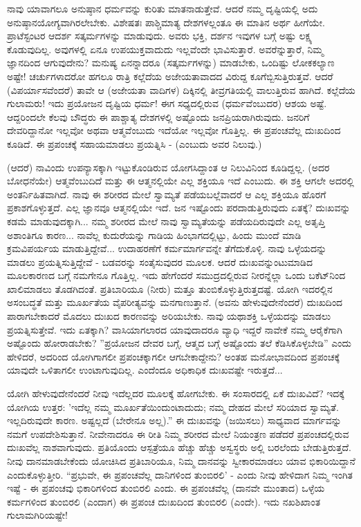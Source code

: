 ನಾವು ಯಾವಾಗಲೂ ಅನುಷ್ಠಾನ ಧರ್ಮವನ್ನು ಕುರಿತು ಮಾತನಾಡುತ್ತೇವೆ. ಆದರೆ ನಮ್ಮ ದೃಷ್ಟಿಯಲ್ಲಿ ಅದು ಅನುಷ್ಠಾನಯೋಗ್ಯವಾಗಿರಲೇಬೇಕು. ವಿಶೇಷತಃ ಪಾಶ್ಚಿಮಾತ್ಯ ದೇಶಗಳಲ್ಲಂತೂ ಈ ಮಾತಿನ ಅರ್ಥ ಹೀಗೆಯೇ. ಪ್ರಾಟೆಸ್ಟಂಟರ ಆದರ್ಶ ಸತ್ಕರ್ಮಗಳನ್ನು ಮಾಡುವುದು. ಅವರು ಭಕ್ತಿ, ದರ್ಶನ ಇವುಗಳ ಬಗ್ಗೆ ಅಷ್ಟು ಲಕ್ಷ್ಯ ಕೊಡುವುದಿಲ್ಲ. ಅವುಗಳಲ್ಲಿ ಏನೂ ಉಪಯುಕ್ತವಾದುದು ಇಲ್ಲವೆಂದೇ ಭಾವಿಸುತ್ತಾರೆ. ಅವರೆನ್ನುತ್ತಾರೆ, ನಿಮ್ಮ ಜ್ಞಾನದಿಂದ ಆಗುವುದೇನು? ಮನುಷ್ಯ ಏನನ್ನಾದರೂ (ಸತ್ಕರ್ಮಗಳನ್ನು) ಮಾಡಬೇಕು, ಒಂದಿಷ್ಟು ಲೋಕಕಲ್ಯಾಣ ಅಷ್ಟೇ! ಚರ್ಚುಗಳಾದರೋ ಹಗಲೂ ರಾತ್ರಿ ಕಲ್ಲೆದೆಯ ಅಜೇಯತಾವಾದದ ವಿರುದ್ದ ಕೂಗೆಬ್ಬಿಸುತ್ತಿರುತ್ತವೆ. ಆದರೆ (ವಿಪರ್ಯಾಸವೆಂದರೆ) ತಾವೇ ಆ (ಅಜೇಯತಾ ವಾದಿಗಳ) ದಿಕ್ಕಿನಲ್ಲಿ ತೀವ್ರಗತಿಯಲ್ಲಿ ವಾಲುತ್ತಿರುವ ಹಾಗಿದೆ. ಕಲ್ಲೆದೆಯ ಗುಲಾಮರು! ಇದು ಪ್ರಯೋಜನ ದೃಷ್ಟಿಯ ಧರ್ಮ! ಈಗ ಸಧ್ಯದಲ್ಲಿರುವ (ಧರ್ಮವೆಂಬುದರ) ಆಶಯ ಅಷ್ಟೆ. ಆದ್ದರಿಂದಲೇ ಕೆಲವು ಬೌದ್ಧರು ಈ ಪಾಶ್ಚಾತ್ಯ ದೇಶಗಳಲ್ಲಿ ಅಷ್ಟೊಂದು ಜನಪ್ರಿಯರಾಗಿರುವುದು. ಜನರಿಗೆ ದೇವರಿದ್ದಾನೋ ಇಲ್ಲವೋ ಅಥವಾ ಆತ್ಮವೆಂಬುದು ಇದೆಯೋ ಇಲ್ಲವೋ ಗೊತ್ತಿಲ್ಲ. ಈ ಪ್ರಪಂಚವೆಲ್ಲ ದುಃಖದಿಂದ ಕೂಡಿದೆ. ಈ ಪ್ರಪಂಚಕ್ಕೆ ಸಹಾಯಮಾಡಲು ಪ್ರಯತ್ನಿಸಿ - (ಎಂಬುದು ಅವರ ನಿಲುವು.)

(ಆದರೆ) ನಾವಿಂದು ಉಪನ್ಯಾಸಕ್ಕಾಗಿ ಇಟ್ಟುಕೊಂಡಿರುವ ಯೋಗಸಿದ್ದಾಂತ ಆ ನಿಲುವಿನಿಂದ ಕೂಡಿದ್ದಲ್ಲ. (ಅದರ ಬೋಧನೆಯೇ) ಆತ್ಮವೆಂಬುದಿದೆ ಮತ್ತು ಈ ಆತ್ಮನಲ್ಲಿಯೇ ಎಲ್ಲ ಶಕ್ತಿಯೂ ಇದೆ ಎಂಬುದು. ಈ ಶಕ್ತಿ ಆಗಲೇ ಅದರಲ್ಲಿ ಅಂತರ್ನಿಹಿತವಾಗಿದೆ. ನಾವು ಈ ಶರೀರದ ಮೇಲೆ ಸ್ವಾಮ್ಯತೆ ಪಡೆಯಬಲ್ಲೆವಾದರೆ ಆ ಎಲ್ಲ ಶಕ್ತಿಯೂ ಹೊರಗೆ ಪ್ರಕಾಶಗೊಳ್ಳುತ್ತದೆ. ಎಲ್ಲ ಜ್ಞಾನವೂ ಆತ್ಮನಲ್ಲಿಯೇ ಇದೆ. ಜನ ಇಷ್ಟೊಂದು ಪರದಾಡುತ್ತಿರುವುದು ಏತಕ್ಕೆ? ದುಃಖವನ್ನು ಕಡಮೆ ಮಾಡುವುದಕ್ಕಾಗಿ... ನಮ್ಮ ಶರೀರದ ಮೇಲೆ ನಾವು ಸ್ವಾಮ್ಯತೆಯನ್ನು ಪಡೆಯದಿರುವುದೇ ಎಲ್ಲ ಅತೃಪ್ತಿ ಅಶಾಂತಿಗೂ ಕಾರಣ... ನಾವೆಲ್ಲ ಕುದುರೆಯನ್ನು ಗಾಡಿಯ ಹಿಂಭಾಗದಲ್ಲಿಟ್ಟು, ಹಿಂದು ಮುಂದೆ ಮಾಡಿ ಕ್ರಮವಿಪರ್ಯಯ ಮಾಡುತ್ತಿದ್ದೇವೆ... ಉದಾಹರಣೆಗೆ ಕರ್ಮಮಾರ್ಗವನ್ನೇ ತೆಗೆದುಕೊಳ್ಳಿ. ನಾವು ಒಳ್ಳೆಯದನ್ನು ಮಾಡಲು ಪ್ರಯತ್ನಿಸುತ್ತಿದ್ದೇವೆ - ಬಡವರನ್ನು ಸಂತೈಸುವುದರ ಮೂಲಕ. ಆದರೆ ದುಃಖವನ್ನುಂಟುಮಾಡಿದ ಮೂಲಕಾರಣದ ಬಗ್ಗೆ ನಮಗೇನೂ ಗೊತ್ತಿಲ್ಲ. ಇದು ಹೇಗೆಂದರೆ ಸಮುದ್ರದಲ್ಲಿರುವ ನೀರನ್ನೆಲ್ಲಾ ಒಂದು ಬಕೆಟ್‌ನಿಂದ ಖಾಲಿಮಾಡಲು ತೊಡಗಿದಂತೆ. ಪ್ರತಿಬಾರಿಯೂ (ನೀರು) ಮತ್ತೂ ತುಂಬಿಕೊಳ್ಳುತ್ತಿರುತ್ತದಷ್ಟೆ. ಯೋಗಿ ಇದರಲ್ಲಿನ ಅಸಂಬದ್ಧತೆ ಮತ್ತು ಮೂರ್ಖತೆಯ ವೈಪರೀತ್ಯವನ್ನು ಮನಗಾಣುತ್ತಾನೆ. (ಅವನು ಹೇಳುವುದೇನೆಂದರೆ) ದುಃಖದಿಂದ ಪಾರಾಗಬೇಕಾದರೆ ಮೊದಲು ದುಃಖದ ಕಾರಣವನ್ನು ಅರಿಯಬೇಕು. ನಾವು ಯಥಾಶಕ್ತಿ ಒಳ್ಳೆಯದನ್ನು ಮಾಡಲು ಪ್ರಯತ್ನಿಸುತ್ತೇವೆ. ಇದು ಏತಕ್ಕಾಗಿ? ವಾಸಿಯಾಗಲಾರದ ಯಾವುದಾದರೂ ವ್ಯಾಧಿ ಇದ್ದರೆ ನಾವೇಕೆ ನಮ್ಮ ಆರೈಕೆಗಾಗಿ ಅಷ್ಟೊಂದು ಹೋರಾಡಬೇಕು? ''ಪ್ರಯೋಜನ ದೇವರ ಬಗ್ಗೆ, ಆತ್ಮದ ಬಗ್ಗೆ ಅಷ್ಟೊಂದು ತಲೆ ಕೆಡಿಸಿಕೊಳ್ಳಬೇಡಿ'' ಎಂದು ಹೇಳಿದರೆ, ಅದರಿಂದ ಯೋಗಿಗಾಗಲೀ ಪ್ರಪಂಚಕ್ಕಾಗಲೀ ಆಗಬೇಕಾದ್ದೇನು? ಅಂತಹ ಮನೋಭಾವದಿಂದ ಪ್ರಪಂಚಕ್ಕೆ ಯಾವುದೇ ಒಳಿತಾಗಲೀ ಉಂಟಾಗುವುದಿಲ್ಲ. ಎಂದೆಂದೂ ಅಧಿಕಾಧಿಕ ದುಃಖವಷ್ಟೇ ಇರುತ್ತದೆ...

ಯೋಗಿ ಹೇಳುವುದೇನೆಂದರೆ ನೀವು ಇದೆಲ್ಲದರ ಮೂಲಕ್ಕೆ ಹೋಗಬೇಕು. ಈ ಸಂಸಾರದಲ್ಲಿ ಏಕೆ ದುಃಖವಿದೆ? ಇದಕ್ಕೆ ಯೋಗಿಯ ಉತ್ತರ: 'ಇದೆಲ್ಲ ನಮ್ಮ ಮೂರ್ಖತೆಯಿಂದುಂಟಾದುದು; ನಮ್ಮ ದೇಹದ ಮೇಲೆ ಸರಿಯಾದ ಸ್ವಾಮ್ಯತೆ. ಇಲ್ಲದಿರುವುದೇ ಕಾರಣ. ಅಷ್ಟಲ್ಲದೆ (ಬೇರೇನೂ ಅಲ್ಲ).” ಈ ದುಃಖವನ್ನು (ಜಯಿಸಲು) ಸಾಧ್ಯವಾದ ಮಾರ್ಗವನ್ನು ನಮಗೆ ಉಪದೇಶಿಸುತ್ತಾನೆ. ನೀವೇನಾದರೂ ಈ ರೀತಿ ನಿಮ್ಮ ಶರೀರದ ಮೇಲೆ ನಿಯಂತ್ರಣ ಪಡೆದರೆ ಪ್ರಪಂಚದಲ್ಲಿರುವ ದುಃಖವೆಲ್ಲ ನಾಶವಾಗುವುದು. ಪ್ರತಿಯೊಂದು ಆಸ್ಪತ್ರೆಯೂ ಹೆಚ್ಚು ಹೆಚ್ಚು ಅಸ್ವಸ್ಥರು ಅಲ್ಲಿ ಬರಲೆಂದು ಬೇಡುತ್ತಿರುತ್ತದೆ. ನೀವು ದಾನಮಾಡಬೇಕೆಂದು ಯೋಚಿಸಿದ ಪ್ರತಿಬಾರಿಯೂ, ನಿಮ್ಮ ದಾನವನ್ನು ಸ್ವೀಕಾರಮಾಡಲು ಯಾವ ಭಿಕಾರಿಯಿದ್ದಾನೆ ಎಂದುಕೊಳ್ಳುತ್ತೀರಿ. “ಪ್ರಭುವೇ, ಈ ಪ್ರಪಂಚವೆಲ್ಲ ದಾನಿಗಳಿಂದ ತುಂಬಿರಲಿ' - ಎಂದು ನೀವು ಹೇಳಿದಾಗ ನಿಮ್ಮ ಇಂಗಿತ ಇಷ್ಟೆ - ಈ ಪ್ರಪಂಚವು ಭಿಕಾರಿಗಳಿಂದ ತುಂಬಿರಲಿ ಎಂದು. ಈ ಪ್ರಪಂಚವೆಲ್ಲ (ದಾನವೇ ಮುಂತಾದ) ಒಳ್ಳೆಯ ಕರ್ಮಗಳಿಂದ ತುಂಬಿರಲಿ (ಎಂದಾಗ) ಈ ಪ್ರಪಂಚ ದುಃಖದಿಂದ ತುಂಬಿರಲಿ (ಎಂದೇ). ಇದು ನಖಶಿಖಾಂತ ಗುಲಾಮಗಿರಿಯಷ್ಟೇ!

